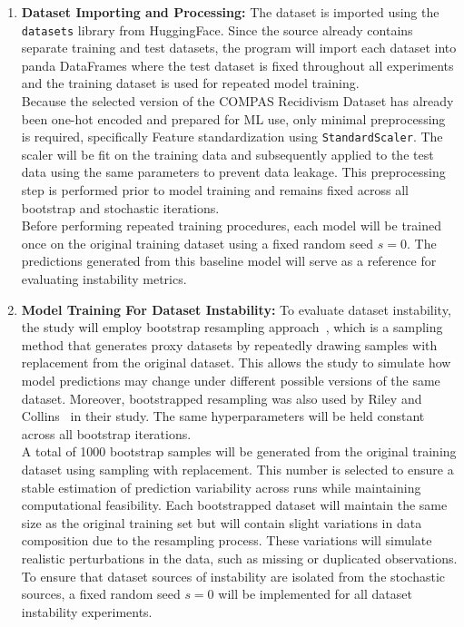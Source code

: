 \documentclass[12pt]{article}
\begin{document}
\begin{enumerate}
  \item \textbf{Dataset Importing and Processing:}
  The dataset is imported using the \texttt{datasets} library from HuggingFace. Since the source already contains separate training and test datasets, the program will import each dataset into panda DataFrames where the test dataset is fixed throughout all experiments and the training dataset is used for repeated model training.\\

  Because the selected version of the COMPAS Recidivism Dataset has already been one-hot encoded and prepared for ML use, only minimal preprocessing is required, specifically Feature standardization using \texttt{StandardScaler}. The scaler will be fit on the training data and subsequently applied to the test data using the same parameters to prevent data leakage. This preprocessing step is performed prior to model training and remains fixed across all bootstrap and stochastic iterations.\\

  Before performing repeated training procedures, each model will be trained once on the original training dataset using a fixed random seed $s = 0$. The predictions generated from this baseline model will serve as a reference for evaluating instability metrics.

  \item \textbf{Model Training For Dataset Instability:}
  To evaluate dataset instability, the study will employ bootstrap resampling approach~\cite{efron2000bootstrap}, which is a sampling method that generates proxy datasets by repeatedly drawing samples with replacement from the original dataset. This allows the study to simulate how model predictions may change under different possible versions of the same dataset. Moreover, bootstrapped resampling was also used by Riley and Collins~\cite{riley2023stability} in their study. The same hyperparameters will be held constant across all bootstrap iterations. \\

  A total of 1000 bootstrap samples will be generated from the original training dataset using sampling with replacement. This number is selected to ensure a stable estimation of prediction variability across runs while maintaining computational feasibility. Each bootstrapped dataset will maintain the same size as the original training set but will contain slight variations in data composition due to the resampling process. These variations will simulate realistic perturbations in the data, such as missing or duplicated observations. To ensure that dataset sources of instability are isolated from the stochastic sources, a fixed random seed $ s = 0 $ will be implemented for all dataset instability experiments.\\ 


\end{enumerate}
\end{document}
